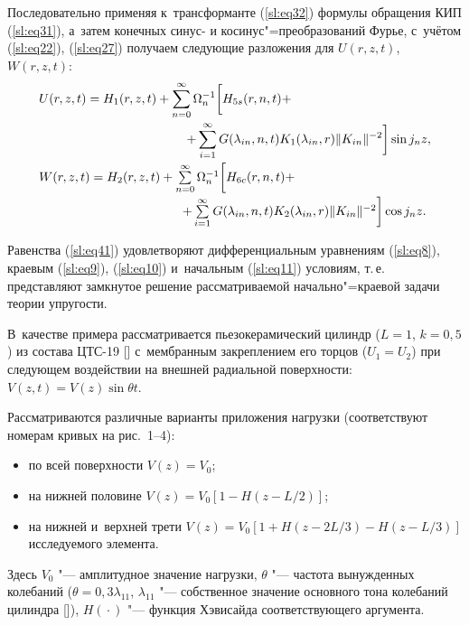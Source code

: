 Последовательно применяя к~трансформанте (\ref{sl:eq32})  формулы обращения КИП (\ref{sl:eq31}), а~затем конечных синус- и косинус"=преобразований Фурье, с~учётом  (\ref{sl:eq22}), (\ref{sl:eq27}) получаем следующие разложения для $U(r, z, t)$, $W(r, z, t)$:
\begin{equation}
\label{sl:eq41}
\begin{array}{l}
\displaystyle
U(r, z, t)=H_1 (r, z, t)+\sum\limits_{n=0}^\infty \Omega_n^{-1} \biggl[ H_{5s} (r, n, t)+ \vspace{1mm}\\
\displaystyle \
\hspace{4cm}
+ \sum\limits_{i=1}^\infty G(\lambda_{in}, n, t) K_1 (\lambda _{in} , r)\|K_{in}\|^{-2}  \biggr] \sin j_n z, \vspace{1mm}\\
W(r, z, t)=H_2 (r, z, t)+\sum\limits_{n=0}^\infty  \Omega_n^{-1}\biggl[ H_{6c} (r, n, t)+ \vspace{1mm}\\
\hspace{4cm}
+ \sum\limits_{i=1}^\infty G(\lambda_{in}, n, t) K_2 (\lambda _{in} , r)\|K_{in}\|^{-2} \biggr] \cos j_n z.
\end{array}
\end{equation}

Равенства (\ref{sl:eq41}) удовлетворяют дифференциальным уравнениям (\ref{sl:eq8}), краевым (\ref{sl:eq9}), (\ref{sl:eq10}) и~начальным (\ref{sl:eq11}) условиям, т.\,е. представляют замкнутое решение  рассматриваемой начально"=краевой задачи теории упругости. 

\smallskip
{}
В~качестве примера рассматривается пьезокерамический цилиндр ($L=1$, $k=0,5$) из состава ЦТС-19 [] с~мембранным закреплением его торцов ($U_1=U_2$) при следующем  воздействии на внешней 
радиальной поверхности: $V(z, t)=V(z)\sin \theta t.$

Рассматриваются различные варианты приложения нагрузки (соответствуют номерам кривых на рис.~1--4): 
\begin{itemize}
\item[1)] по всей поверхности $V(z)=V_0 $;
\item[2)] на нижней половине $V(z)=V_0[1-H(z-L/2)]$;
\item[3)] на нижней и~верхней трети $V(z)=V_0 [1+H(z-2L/3)-H(z-L/3)]$ исследуемого элемента. 
\end{itemize}
Здесь $V_0$ "--- амплитудное значение нагрузки, $\theta$ "--- частота вынужденных колебаний ($\theta =0,3\lambda _{11}$, $\lambda _{11} $ "--- собственное 
значение основного тона колебаний цилиндра [\citen{sl:c:6}]), $H( {} \cdot {} )$  "--- функция Хэвисайда соответствующего аргумента.


